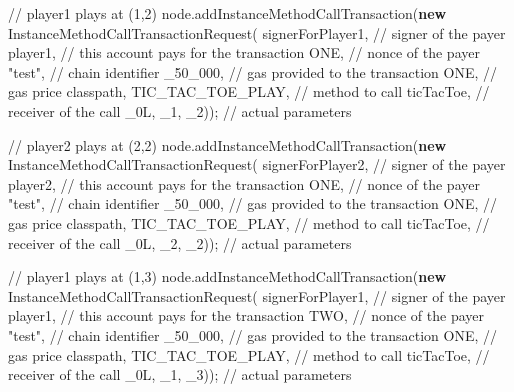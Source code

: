 \documentclass[a4paper,]{book}
\newenvironment{Shaded}{\begin{snugshade}}{\end{snugshade}}
\newcommand{\CommentTok}[1]{\textcolor[rgb]{0.54,0.53,0.53}{#1}}
\newcommand{\DecValTok}[1]{\textcolor[rgb]{0.69,0.50,0.00}{#1}}
\newcommand{\FunctionTok}[1]{\textcolor[rgb]{0.39,0.29,0.61}{#1}}
\newcommand{\KeywordTok}[1]{\textcolor[rgb]{0.12,0.11,0.11}{\textbf{#1}}}
\newcommand{\NormalTok}[1]{\textcolor[rgb]{0.12,0.11,0.11}{#1}}
\newcommand{\StringTok}[1]{\textcolor[rgb]{0.75,0.01,0.01}{#1}}
\renewenvironment{Shaded}{\begin{snugshade}\small}{\end{snugshade}}
\begin{document}
{\begin{Shaded}
\begin{Highlighting}[]
      \CommentTok{// player1 plays at (1,2)}
\NormalTok{      node.}\FunctionTok{addInstanceMethodCallTransaction}\NormalTok{(}\KeywordTok{new} \FunctionTok{InstanceMethodCallTransactionRequest}\NormalTok{(}
\NormalTok{        signerForPlayer1, }\CommentTok{// signer of the payer}
\NormalTok{        player1, }\CommentTok{// this account pays for the transaction}
\NormalTok{        ONE, }\CommentTok{// nonce of the payer}
        \StringTok{"test"}\NormalTok{, }\CommentTok{// chain identifier}
\NormalTok{        _}\DecValTok{50_000}\NormalTok{, }\CommentTok{// gas provided to the transaction}
\NormalTok{        ONE, }\CommentTok{// gas price}
\NormalTok{        classpath,}
\NormalTok{        TIC_TAC_TOE_PLAY, }\CommentTok{// method to call}
\NormalTok{        ticTacToe, }\CommentTok{// receiver of the call}
\NormalTok{        _}\DecValTok{0L}\NormalTok{, _}\DecValTok{1}\NormalTok{, _}\DecValTok{2}\NormalTok{)); }\CommentTok{// actual parameters}

      \CommentTok{// player2 plays at (2,2)}
\NormalTok{      node.}\FunctionTok{addInstanceMethodCallTransaction}\NormalTok{(}\KeywordTok{new} \FunctionTok{InstanceMethodCallTransactionRequest}\NormalTok{(}
\NormalTok{        signerForPlayer2, }\CommentTok{// signer of the payer}
\NormalTok{        player2, }\CommentTok{// this account pays for the transaction}
\NormalTok{        ONE, }\CommentTok{// nonce of the payer}
        \StringTok{"test"}\NormalTok{, }\CommentTok{// chain identifier}
\NormalTok{        _}\DecValTok{50_000}\NormalTok{, }\CommentTok{// gas provided to the transaction}
\NormalTok{        ONE, }\CommentTok{// gas price}
\NormalTok{        classpath,}
\NormalTok{        TIC_TAC_TOE_PLAY, }\CommentTok{// method to call}
\NormalTok{        ticTacToe, }\CommentTok{// receiver of the call}
\NormalTok{        _}\DecValTok{0L}\NormalTok{, _}\DecValTok{2}\NormalTok{, _}\DecValTok{2}\NormalTok{)); }\CommentTok{// actual parameters}

      \CommentTok{// player1 plays at (1,3)}
\NormalTok{      node.}\FunctionTok{addInstanceMethodCallTransaction}\NormalTok{(}\KeywordTok{new} \FunctionTok{InstanceMethodCallTransactionRequest}\NormalTok{(}
\NormalTok{        signerForPlayer1, }\CommentTok{// signer of the payer}
\NormalTok{        player1, }\CommentTok{// this account pays for the transaction}
\NormalTok{        TWO, }\CommentTok{// nonce of the payer}
        \StringTok{"test"}\NormalTok{, }\CommentTok{// chain identifier}
\NormalTok{        _}\DecValTok{50_000}\NormalTok{, }\CommentTok{// gas provided to the transaction}
\NormalTok{        ONE, }\CommentTok{// gas price}
\NormalTok{        classpath,}
\NormalTok{        TIC_TAC_TOE_PLAY, }\CommentTok{// method to call}
\NormalTok{        ticTacToe, }\CommentTok{// receiver of the call}
\NormalTok{        _}\DecValTok{0L}\NormalTok{, _}\DecValTok{1}\NormalTok{, _}\DecValTok{3}\NormalTok{)); }\CommentTok{// actual parameters}


\end{Highlighting}
\end{Shaded}}
\end{document}
